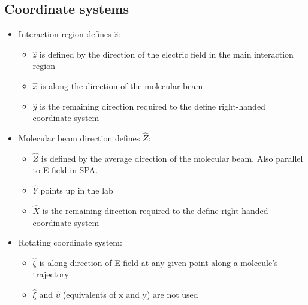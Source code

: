 \subsection{Coordinate systems}
\begin{itemize}
    \item Interaction region defines $\hat{z}$:
    \begin{itemize}
        \item $\hat{z}$ is defined by the direction of the electric field in the main interaction region
        \item $\hat{x}$ is along the direction of the molecular beam
        \item $\hat{y}$ is the remaining direction required to the define right-handed coordinate system
    \end{itemize}
    
    \item Molecular beam direction defines $\hat{Z}$:
        \begin{itemize}
        \item $\hat{Z}$ is defined by the average direction of the molecular beam. Also parallel to E-field in SPA.
        \item $\hat{Y}$ points up in the lab
        \item $\hat{X}$ is the remaining direction required to the define right-handed coordinate system
    \end{itemize}
    
    \item Rotating coordinate system: 
    \begin{itemize}
        \item $\hat{\zeta}$ is along direction of E-field at any given point along a molecule's trajectory
        \item $\hat{\xi}$ and $\hat{\upsilon}$ (equivalents of x and y) are not used 
    \end{itemize}
\end{itemize}

